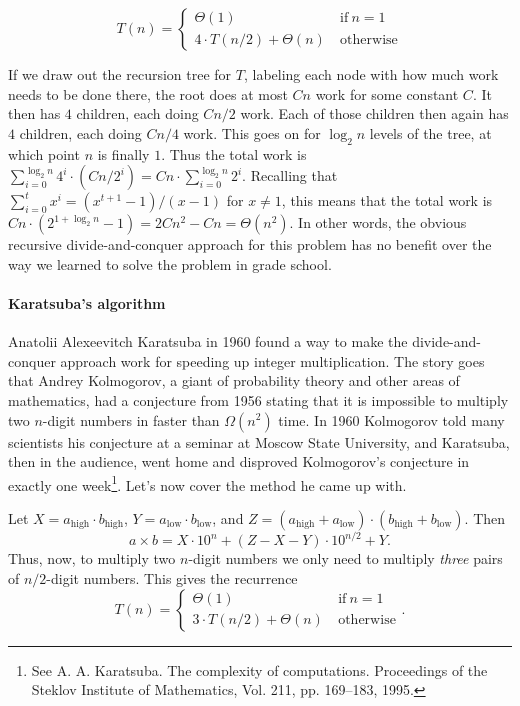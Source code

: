 \documentclass[11pt]{article}
\begin{document}
$$
T(n) = \begin{cases} \Theta(1) \ &
  \mathrm{if}\ n=1
\\ 4\cdot T(n/2) + \Theta(n) \
&\mathrm{otherwise} \end{cases}
$$

If we draw out the recursion tree for $T$, labeling each node with how
much work needs to be done there, the root does at most $Cn$ work for
some constant $C$.  It then has $4$ children, each doing $Cn/2$ work.
Each of those children then again has $4$ children, each doing $Cn/4$
work.  This goes on for $\log_2 n$ levels of the tree, at which point
$n$ is finally $1$.  Thus the total work is $\sum_{i=0}^{\log_2 n} 4^i
\cdot (Cn/2^i) = Cn \cdot \sum_{i=0}^{\log_2 n} 2^i$.  Recalling that
$\sum_{i=0}^t x^i = (x^{t+1} - 1)/(x - 1)$ for $x\neq 1$, this means
that the total work is $Cn \cdot (2^{1 + \log_2 n} - 1) = 2Cn^2 - Cn =
\Theta(n^2)$.  In other words, the obvious recursive
divide-and-conquer approach for this problem has no benefit over the
way we learned to solve the problem in grade school.

\paragraph{Karatsuba's algorithm}

Anatolii Alexeevitch Karatsuba in 1960 found a way to make the
divide-and-conquer approach work for speeding up integer
multiplication.  The story goes that Andrey Kolmogorov, a giant of
probability theory and other areas of mathematics, had a conjecture from
1956 stating that it is impossible to
multiply two $n$-digit numbers in faster than $\Omega(n^2)$ time.  In
1960 Kolmogorov told many scientists his conjecture at a seminar at
Moscow State University,
and Karatsuba, then in the audience, went home and disproved
Kolmogorov's conjecture in exactly one week\footnote{See
  A. A. Karatsuba. The complexity of computations. Proceedings of the
  Steklov Institute of Mathematics, Vol. 211, pp. 169--183,
  1995.}. Let's now cover the method he came up with.

Let $X = a_{\mathrm{high}}\cdot b_{\mathrm{high}}$, $Y =
a_{\mathrm{low}}\cdot b_{\mathrm{low}}$, and $Z = (a_{\mathrm{high}} +
a_{\mathrm{low}})\cdot (b_{\mathrm{high}} + b_{\mathrm{low}})$.
Then
$$ a\times b = X\cdot 10^n + (Z - X - Y)\cdot 10^{n/2} + Y .$$
Thus, now, to multiply two $n$-digit numbers we only need to multiply
{\em three} pairs of $n/2$-digit numbers.  This gives the recurrence
$$
T(n) = \begin{cases} \Theta(1) \ &
  \mathrm{if}\ n=1
\\ 3\cdot T(n/2) + \Theta(n) \
&\mathrm{otherwise} \end{cases} .
$$
\end{document}
